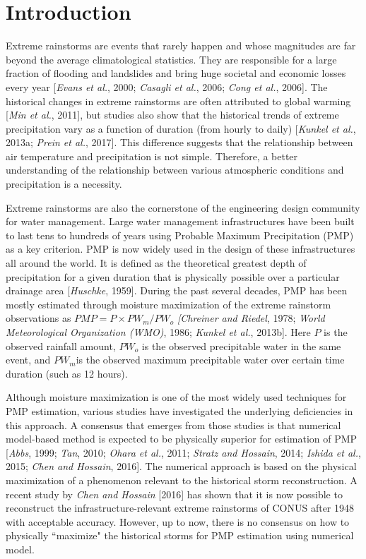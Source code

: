 \vspace{20mm}

\section{Introduction}
 
Extreme rainstorms are events that rarely happen and whose magnitudes are far beyond the average climatological statistics. They are responsible for a large fraction of flooding and landslides and bring huge societal and economic losses every year [\textit{Evans et al.}, 2000; \textit{Casagli et al.}, 2006; \textit{Cong et al.}, 2006]. The historical changes in extreme rainstorms are often attributed to global warming [\textit{Min et al.}, 2011], but studies also show that the historical trends of extreme precipitation vary as a function of duration (from hourly to daily) [\textit{Kunkel et al.}, 2013a; \textit{Prein et al.}, 2017]. This difference suggests that the relationship between air temperature and precipitation is not simple. Therefore, a better understanding of the relationship between various atmospheric conditions and precipitation is a necessity.

Extreme rainstorms are also the cornerstone of the engineering design community for water management. Large water management infrastructures have been built to last tens to hundreds of years using Probable Maximum Precipitation (PMP) as a key criterion. PMP is now widely used in the design of these infrastructures all around the world. It is defined as the theoretical greatest depth of precipitation for a given duration that is physically possible over a particular drainage area [\textit{Huschke}, 1959]. During the past several decades, PMP has been mostly estimated through moisture maximization of the extreme rainstorm observations as $PMP={P}\times{PW_m}/{PW_o}$ \textit{[Chreiner and Riedel}, 1978; \textit{World Meteorological Organization (WMO)}, 1986; \textit{Kunkel et al.}, 2013b]. Here $P$ is the observed rainfall amount, $PW_o$ is the observed precipitable water in the same event, and $PW_m$is the observed maximum precipitable water over certain time duration (such as 12 hours).

Although moisture maximization is one of the most widely used techniques for PMP estimation, various studies have investigated the underlying deficiencies in this approach. A consensus that emerges from those studies is that numerical model-based method is expected to be physically superior for estimation of PMP [\textit{Abbs}, 1999; \textit{Tan}, 2010; \textit{Ohara et al.}, 2011; \textit{Stratz and Hossain}, 2014; \textit{Ishida et al.}, 2015; \textit{Chen and Hossain}, 2016]. The numerical approach is based on the physical maximization of a phenomenon relevant to the historical storm reconstruction. A recent study by \textit{Chen and Hossain} [2016] has shown that it is now possible to reconstruct the infrastructure-relevant extreme rainstorms of CONUS after 1948 with acceptable accuracy. However, up to now, there is no consensus on how to physically ``maximize" the historical storms for PMP estimation using numerical model.

